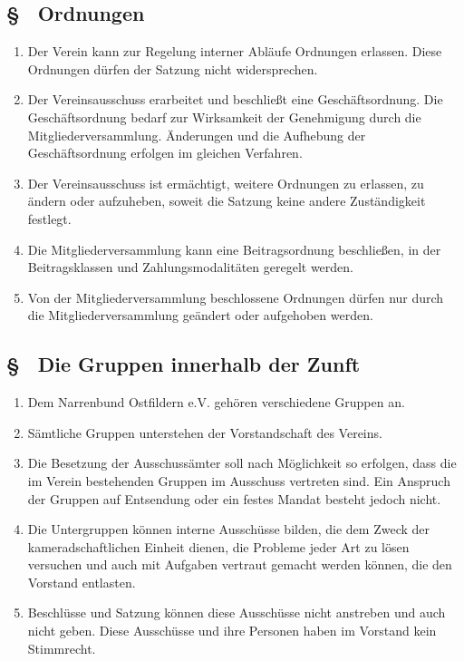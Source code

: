 \subsection{§ \thesaparagraphcounter\ Ordnungen} \label{sa:par:ordnungen}
\begin{enumerate}
    \item \label{sa:abs:kpjeeh} Der Verein kann zur Regelung interner Abläufe Ordnungen erlassen. Diese Ordnungen dürfen der Satzung nicht widersprechen.

    \item \label{sa:abs:zyb87y} Der Vereinsausschuss erarbeitet und beschließt eine Geschäftsordnung. Die Geschäftsordnung bedarf zur Wirksamkeit der Genehmigung durch die Mitgliederversammlung. Änderungen und die Aufhebung der Geschäftsordnung erfolgen im gleichen Verfahren.

    \item \label{sa:abs:s06yz6} Der Vereinsausschuss ist ermächtigt, weitere Ordnungen zu erlassen, zu ändern oder aufzuheben, soweit die Satzung keine andere Zuständigkeit festlegt.

    \item \label{sa:abs:f4vh77} Die Mitgliederversammlung kann eine Beitragsordnung beschließen, in der Beitragsklassen und Zahlungsmodalitäten geregelt werden.

    \item \label{sa:abs:mw9983} Von der Mitgliederversammlung beschlossene Ordnungen dürfen nur durch die Mitgliederversammlung geändert oder aufgehoben werden.
\end{enumerate}

\subsection{§ \thesaparagraphcounter\ Die Gruppen innerhalb der Zunft} \label{sa:par:gruppen_zunft}
\begin{enumerate}
    \item \label{sa:abs:0a2xpi} Dem Narrenbund Ostfildern e.V. gehören verschiedene Gruppen an.

    \item \label{sa:abs:bi3k85} Sämtliche Gruppen unterstehen der Vorstandschaft des Vereins.

    \item \label{sa:abs:tkuztx} Die Besetzung der Ausschussämter soll nach Möglichkeit so erfolgen, dass die im Verein bestehenden Gruppen im Ausschuss vertreten sind. Ein Anspruch der Gruppen auf Entsendung oder ein festes Mandat besteht jedoch nicht.

    \item \label{sa:abs:k22glz} Die Untergruppen können interne Ausschüsse bilden, die dem Zweck der kameradschaftlichen Einheit dienen, die Probleme jeder Art zu lösen versuchen und auch mit Aufgaben vertraut gemacht werden können, die den Vorstand entlasten.

    \item \label{sa:abs:s5hsk7} Beschlüsse und Satzung können diese Ausschüsse nicht anstreben und auch nicht geben. Diese Ausschüsse und ihre Personen haben im Vorstand kein Stimmrecht.
\end{enumerate}


